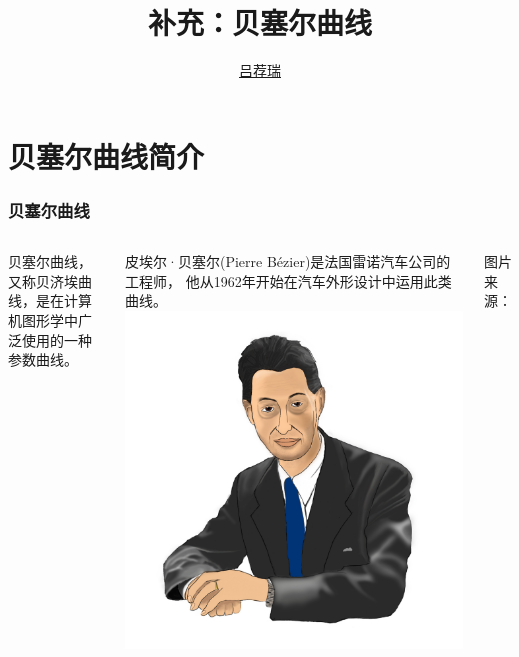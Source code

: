 \documentclass[14pt,notheorems,leqno,xcolor={rgb}]{beamer} %
\begin{document}

\title{补充：贝塞尔曲线}
\author{\href{https://lvjr.bitbucket.io}{吕荐瑞}}

\begin{frame}[plain]
\titlepage
\end{frame}

\section{贝塞尔曲线简介}

\begin{frame}
\frametitle{贝塞尔曲线}
\begin{columns}[onlytextwidth]
贝塞尔曲线，又称贝济埃曲线，是在计算机图形学中广泛使用的一种参数曲线。
\par\vspace{0.3em}
皮埃尔·贝塞尔(Pierre B\'ezier)是法国雷诺汽车公司的工程师，
他从1962年开始在汽车外形设计中运用此类曲线。
\pause
{}
\includegraphics[width=\textwidth]{Pierre-bezier-portrait}
\par\hfill\small 图片来源：
\href{https://commons.wikimedia.org/wiki/File:Pierre-bezier-portrait.jpg}{}
\end{columns}
\end{frame}
\end{document}
